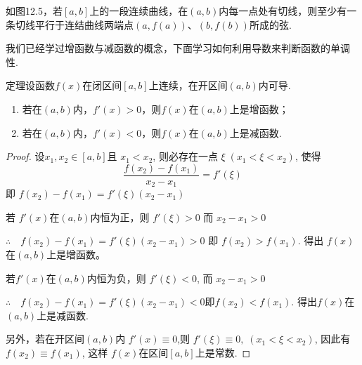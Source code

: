 如图12.5，若$[a,b]$上的一段连续曲线，在$(a,b)$内每一点处有切线，则至少有一条切线平行于连结曲线两端点$(a,f(a))$、$(b,f(b))$所成的弦.

\begin{figure}[htp]
    \centering
{}
    \caption{}
\end{figure}


我们已经学过增函数与减函数的概念，下面学习如何利用导数来判断函数的单调性.

\begin{thm}
    {定理}设函数$f(x)$在闭区间$[a,b]$上连续，在开区间$(a,b)$内可导.
\begin{enumerate}[(1)]
\item 若在$(a,b)$内，$f'(x)>0$，则$f(x)$在$(a,b)$上是增函数；
\item 若在$(a,b)$内，$f'(x)<0$，则$f(x)$在$(a,b)$上是减函数.
\end{enumerate}
\end{thm}

\begin{proof}
设$x_1,x_2\in[a,b]$且 $x_1<x_2$, 则必存在一点 $\xi\; (x_1<\xi<x_2)$, 使得
$$\frac{f(x_{2})-f(x_{1})}{x_{2}-x_{1}}=f'(\xi)$$
即 $f( x_{2}) - f( x_{1}) = f'( \xi ) ( x_{2}- x_{1})$

若 $f'(x)$在$(a,b)$内恒为正，则 $f'({\xi})>0$ 而 $x_2-x_1>0$

$\therefore\quad f( x_{2}) - f( x_{1}) = f'( \xi ) ( x_{2}- x_{1}) > 0$ 即
$f(x_{2})>f(x_{1})$. 得出 $f(x)$在$(a,b)$上是增函数。

若$f'(x)$在$(a,b)$内恒为负，则 $f'(\xi)<0$, 而 $x_{2}-x_{1}>0$

$\therefore\quad f( x_{2}) - f( x_{1}) = f'( \xi ) ( x_{2}- x_{1}) < 0$即$f(x_{2})<f(x_1)$. 得出$f(x)$在$(a,b)$上是减函数.

另外，若在开区间$(a,b)$内 $f'(x)\equiv 0$,则 $f'({\xi})\equiv0,\; (x_{1}<\xi<x_{2})$, 因此有 $f(x_{2})\equiv f(x_{1})$, 这样 $f(x)$在区间$[a,b]$上是常数.
\end{proof}



